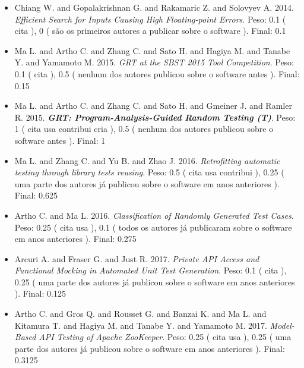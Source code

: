\begin{itemize}
\item Chiang W. and Gopalakrishnan G. and Rakamaric Z. and Solovyev A.
      2014.
        \textit{ Efficient Search for Inputs Causing High Floating-point Errors}.
      Peso:
      0.1 (
          cita
      ),
      0 (
são os primeiros autores a publicar sobre o software
      ).
      Final:
      0.1

\item Ma L. and Artho C. and Zhang C. and Sato H. and Hagiya M. and Tanabe Y. and Yamamoto M.
      2015.
        \textit{ GRT at the SBST 2015 Tool Competition}.
      Peso:
      0.1 (
          cita
      ),
      0.5 (
nenhum dos autores publicou sobre o software antes
      ).
      Final:
      0.15

\item Ma L. and Artho C. and Zhang C. and Sato H. and Gmeiner J. and Ramler R.
      2015.
        \textbf{\textit{ GRT: Program-Analysis-Guided Random Testing (T)}}.
      Peso:
      1 (
          cita
          usa
          contribui
          cria
      ),
      0.5 (
nenhum dos autores publicou sobre o software antes
      ).
      Final:
      1

\item Ma L. and Zhang C. and Yu B. and Zhao J.
      2016.
        \textit{ Retrofitting automatic testing through library tests reusing}.
      Peso:
      0.5 (
          cita
          usa
          contribui
      ),
      0.25 (
uma parte dos autores já publicou sobre o software em anos anteriores
      ).
      Final:
      0.625

\item Artho C. and Ma L.
      2016.
        \textit{ Classification of Randomly Generated Test Cases}.
      Peso:
      0.25 (
          cita
          usa
      ),
      0.1 (
todos os autores já publicaram sobre o software em anos anteriores
      ).
      Final:
      0.275

\item Arcuri A. and Fraser G. and Just R.
      2017.
        \textit{ Private API Access and Functional Mocking in Automated Unit Test Generation}.
      Peso:
      0.1 (
          cita
      ),
      0.25 (
uma parte dos autores já publicou sobre o software em anos anteriores
      ).
      Final:
      0.125

\item Artho C. and Gros Q. and Rousset G. and Banzai K. and Ma L. and Kitamura T. and Hagiya M. and Tanabe Y. and Yamamoto M.
      2017.
        \textit{ Model-Based API Testing of Apache ZooKeeper}.
      Peso:
      0.25 (
          cita
          usa
      ),
      0.25 (
uma parte dos autores já publicou sobre o software em anos anteriores
      ).
      Final:
      0.3125


\end{itemize}
